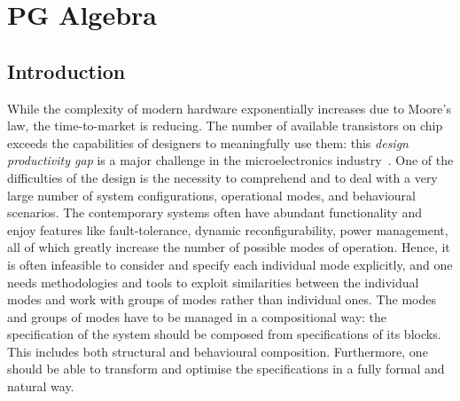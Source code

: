 \section{PG Algebra}

\subsection{Introduction}

\thispagestyle{plain}While the complexity of modern hardware exponentially
increases due to Moore's law, the time-to-market is reducing. The
number of available transistors on chip exceeds the capabilities of
designers to meaningfully use them: this \emph{design productivity
gap} is a major challenge in the microelectronics industry~\cite{2009_design_itrs}.
One of the difficulties of the design is the necessity to comprehend
and to deal with a very large number of system configurations, operational
modes, and behavioural scenarios. The contemporary systems often have
abundant functionality and enjoy features like fault-tolerance, dynamic
reconfigurability, power management, all of which greatly increase
the number of possible modes of operation. Hence, it is often infeasible
to consider and specify each individual mode explicitly, and one needs
methodologies and tools to exploit similarities between the individual
modes and work with groups of modes rather than individual ones. The
modes and groups of modes have to be managed in a compositional way:
the specification of the system should be composed from specifications
of its blocks. This includes both structural and behavioural composition.
Furthermore, one should be able to transform and optimise the specifications
in a fully formal and natural way.

